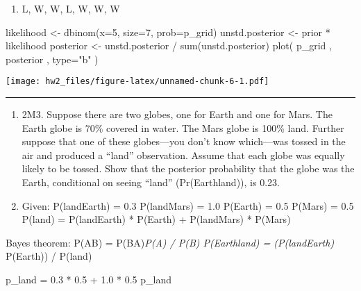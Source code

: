 \documentclass[
]{article}
\newenvironment{Shaded}{\begin{snugshade}}{\end{snugshade}}
\newcommand{\AttributeTok}[1]{\textcolor[rgb]{0.77,0.63,0.00}{#1}}
\newcommand{\DecValTok}[1]{\textcolor[rgb]{0.00,0.00,0.81}{#1}}
\newcommand{\FloatTok}[1]{\textcolor[rgb]{0.00,0.00,0.81}{#1}}
\newcommand{\FunctionTok}[1]{\textcolor[rgb]{0.00,0.00,0.00}{#1}}
\newcommand{\NormalTok}[1]{#1}
\newcommand{\OtherTok}[1]{\textcolor[rgb]{0.56,0.35,0.01}{#1}}
\newcommand{\SpecialCharTok}[1]{\textcolor[rgb]{0.00,0.00,0.00}{#1}}
\newcommand{\StringTok}[1]{\textcolor[rgb]{0.31,0.60,0.02}{#1}}
\providecommand{\tightlist}{%
  \setlength{\itemsep}{0pt}\setlength{\parskip}{0pt}}
\begin{document}
\begin{enumerate}
\def\labelenumi{(\arabic{enumi})}
\setcounter{enumi}{2}
\tightlist
\item
  L, W, W, L, W, W, W
\end{enumerate}

\begin{Shaded}
\begin{Highlighting}[]
\NormalTok{likelihood }\OtherTok{\textless{}{-}} \FunctionTok{dbinom}\NormalTok{(}\AttributeTok{x=}\DecValTok{5}\NormalTok{, }\AttributeTok{size=}\DecValTok{7}\NormalTok{, }\AttributeTok{prob=}\NormalTok{p\_grid)}
\NormalTok{unstd.posterior }\OtherTok{\textless{}{-}}\NormalTok{ prior }\SpecialCharTok{*}\NormalTok{ likelihood}
\NormalTok{posterior }\OtherTok{\textless{}{-}}\NormalTok{ unstd.posterior }\SpecialCharTok{/} \FunctionTok{sum}\NormalTok{(unstd.posterior)}
\FunctionTok{plot}\NormalTok{( p\_grid , posterior , }\AttributeTok{type=}\StringTok{"b"}\NormalTok{ )}
\end{Highlighting}
\end{Shaded}

\texttt{[image: hw2\_files/figure-latex/unnamed-chunk-6-1.pdf]}

\begin{center}\rule{0.5\linewidth}{0.5pt}\end{center}

\begin{enumerate}
\def\labelenumi{\Alph{enumi})}
\setcounter{enumi}{16}
\item
  2M3. Suppose there are two globes, one for Earth and one for Mars. The
  Earth globe is 70\% covered in water. The Mars globe is 100\% land.
  Further suppose that one of these globes---you don't know which---was
  tossed in the air and produced a ``land'' observation. Assume that
  each globe was equally likely to be tossed. Show that the posterior
  probability that the globe was the Earth, conditional on seeing
  ``land'' (Pr(Earth\textbar land)), is 0.23.
\item
  Given: P(land\textbar Earth) = 0.3 P(land\textbar Mars) = 1.0 P(Earth)
  = 0.5 P(Mars) = 0.5 P(land) = P(land\textbar Earth) * P(Earth) +
  P(land\textbar Mars) * P(Mars)
\end{enumerate}

Bayes theorem: P(A\textbar B) = P(B\textbar A)\emph{P(A) / P(B)
P(Earth\textbar land) = (P(land\textbar Earth) } P(Earth)) / P(land)

\begin{Shaded}
\begin{Highlighting}[]
\NormalTok{p\_land }\OtherTok{=} \FloatTok{0.3} \SpecialCharTok{*} \FloatTok{0.5} \SpecialCharTok{+} \FloatTok{1.0} \SpecialCharTok{*} \FloatTok{0.5}
\NormalTok{p\_land}
\end{Highlighting}
\end{Shaded}
\end{document}
